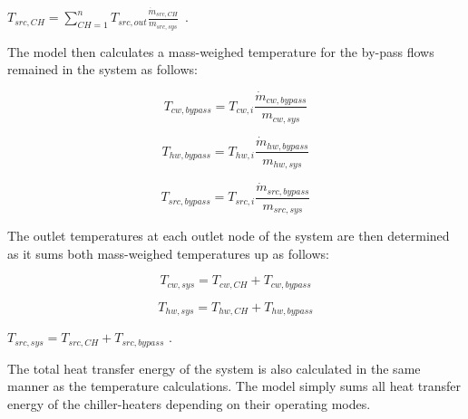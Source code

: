 \textbf{\emph{\({T_{src,CH}} = \sum\limits_{CH = 1}^n {{T_{src,out}}} \frac{{{{\dot m}_{src,CH}}}}{{{m_{src,sys}}}}\)}}~.

The model then calculates a mass-weighed temperature for the by-pass flows remained in the system as follows:

\begin{equation}
{T_{cw,bypass}} = {T_{cw,i}}\frac{{{{\dot m}_{cw,bypass}}}}{{{m_{cw,sys}}}}
\end{equation}

\begin{equation}
{T_{hw,bypass}} = {T_{hw,i}}\frac{{{{\dot m}_{hw,bypass}}}}{{{m_{hw,sys}}}}
\end{equation}

\begin{equation}
{T_{src,bypass}} = {T_{src,i}}\frac{{{{\dot m}_{src,bypass}}}}{{{m_{src,sys}}}}
\end{equation}

The outlet temperatures at each outlet node of the system are then determined as it sums both mass-weighed temperatures up as follows:

\begin{equation}
{T_{cw,sys}} = {T_{cw,CH}} + {T_{cw,bypass}}
\end{equation}

\begin{equation}
{T_{hw,sys}} = {T_{hw,CH}} + {T_{hw,bypass}}
\end{equation}

\({T_{src,sys}} = {T_{src,CH}} + {T_{src,bypass}}\) .

The total heat transfer energy of the system is also calculated in the same manner as the temperature calculations. The model simply sums all heat transfer energy of the chiller-heaters depending on their operating modes.
